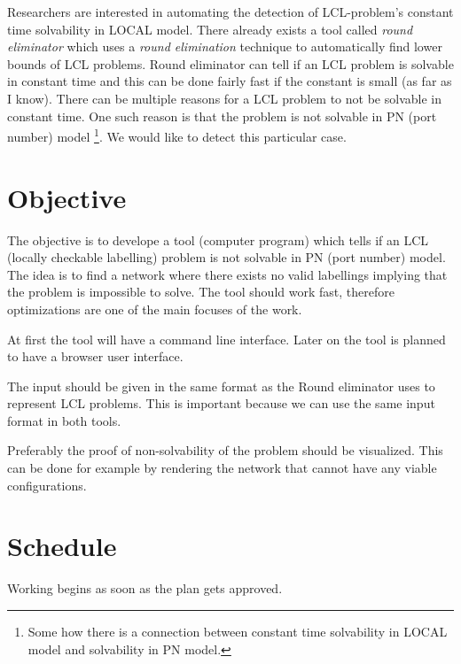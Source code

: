 \documentclass[12pt,a4paper,english,oneside]{article}
\begin{document}
Researchers are interested in automating the detection of LCL-problem's constant time solvability in LOCAL model.
There already exists a tool called \emph{round eliminator} \cite{DBLP:conf/podc/Olivetti20} which uses a \emph{round elimination} \cite{DBLP:conf/podc/Brandt19} technique to automatically find lower bounds of LCL problems.
Round eliminator can tell if an LCL problem is solvable in constant time and this can be done fairly fast if the constant is small (as far as I know).
There can be multiple reasons for a LCL problem to not be solvable in constant time.
One such reason is that the problem is not solvable in PN (port number) model
\footnote{Some how there is a connection between constant time solvability in LOCAL model and solvability in PN model.}.
We would like to detect this particular case.


\section*{Objective}
The objective is to develope a tool (computer program) which tells if an LCL (locally checkable labelling) problem is not solvable in PN (port number) model.
The idea is to find a network where there exists no valid labellings implying that the problem is impossible to solve.
The tool should work fast, therefore optimizations are one of the main focuses of the work.

At first the tool will have a command line interface.
Later on the tool is planned to have a browser user interface.

The input should be given in the same format as the Round eliminator uses to represent LCL problems.
This is important because we can use the same input format in both tools.

Preferably the proof of non-solvability of the problem should be visualized.
This can be done for example by rendering the network that cannot have any viable configurations.

\section*{Schedule}

Working begins as soon as the plan gets approved.

\printbibliography
\end{document}
